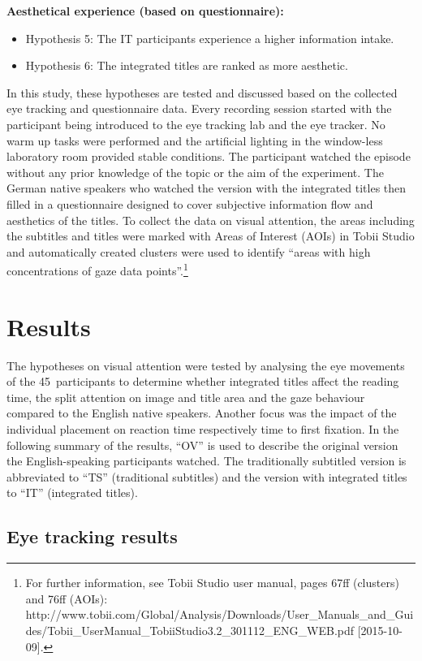\documentclass[output=paper]{langsci/langscibook}
\begin{document}
\textbf{Aesthetical experience (based on questionnaire):}

\begin{itemize}
\item Hypothesis 5: The IT participants experience a higher information intake.
\item Hypothesis 6: The integrated titles are ranked as more aesthetic.
\end{itemize}


In this study, these hypotheses are tested and discussed based on the collected eye tracking and questionnaire data. Every recording session started with the participant being introduced to the eye tracking lab and the eye tracker. No warm up tasks were performed and the artificial lighting in the window-less laboratory room provided stable conditions. The participant watched the episode without any prior knowledge of the topic or the aim of the experiment. The German native speakers who watched the version with the integrated titles then filled in a questionnaire designed to cover subjective information flow and aesthetics of the titles. To collect the data on visual attention, the areas including the subtitles and titles were marked with Areas of Interest (AOIs) in Tobii Studio and automatically created clusters were used to identify “areas with high concentrations of gaze data points”.\footnote{For further information, see Tobii Studio user manual, pages 67ff (clusters) and 76ff (AOIs): http://www.tobii.com/Global/Analysis/Downloads/User\_Manuals\_and\_Guides/Tobii\_UserManual\_TobiiStudio3.2\_301112\_ENG\_WEB.pdf [2015-10-09].}

\section{Results}

The hypotheses on visual attention were tested by analysing the eye movements of the 45~participants to determine whether integrated titles affect the reading time, the split attention on image and title area and the gaze behaviour compared to the English native speakers. Another focus was the impact of the individual placement on reaction time respectively time to first fixation. In the following summary of the results, “OV” is used to describe the original version the English-speaking participants watched. The traditionally subtitled version is abbreviated to “TS” (traditional subtitles) and the version with integrated titles to “IT” (integrated titles).

\subsection{Eye tracking results}
\end{document}
